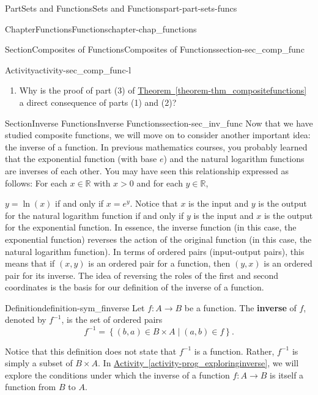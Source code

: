 \documentclass[oneside,10pt,]{book}
\newcommand{\xreffont}{\relax}
\newcommand{\terminology}[1]{\textbf{#1}}
\numberwithin{equation}{chapter}
\newcommand{\R}{\mathbb{R}}
\newcommand{\gt}{>}
\begin{document}
\begin{partptx}{Part}{Sets and Functions}{}{Sets and Functions}{}{}{part-part-sets-funcs}
\begin{chapterptx}{Chapter}{Functions}{}{Functions}{}{}{chapter-chap_functions}
\begin{sectionptx}{Section}{Composites of Functions}{}{Composites of Functions}{}{}{section-sec_comp_func}
\begin{activity}{Activity}{}{activity-sec_comp_func-l}
\begin{enumerate}[font=\bfseries,label=(\alph*),ref=\alph*]
\item{}Why is the proof of part (3) of \hyperref[theorem-thm_compositefunctions]{Theorem~{\xreffont\ref{theorem-thm_compositefunctions}}} a direct consequence of parts (1) and (2)?%
\end{enumerate}%
\end{activity}%
\end{sectionptx}
%
%
\typeout{************************************************}
\typeout{************************************************}
%
\begin{sectionptx}{Section}{Inverse Functions}{}{Inverse Functions}{}{}{section-sec_inv_func}
Now that we have studied composite functions, we will move on to consider another important idea: the inverse of a function. In previous mathematics courses, you probably learned that the exponential function (with base \(e\)) and the natural logarithm functions are inverses of each other. You may have seen this relationship expressed as follows: For each \(x \in \R\) with \(x \gt 0\) and for each \(y \in \R\),%
\par
\(y = \ln(x)\) if and only if \(x = e^y\). Notice that \(x\) is the input and \(y\) is the output for the natural logarithm function if and only if \(y\) is the input and \(x\) is the output for the exponential function. In essence, the inverse function (in this case, the exponential function) reverses the action of the original function (in this case, the natural logarithm function). In terms of ordered pairs (input-output pairs), this means that if \(( {x, y} )\) is an ordered pair for a function, then \(( {y, x} )\) is an ordered pair for its inverse. The idea of reversing the roles of the first and second coordinates is the basis for our definition of the inverse of a function.%
\begin{definition}{Definition}{}{definition-sym_finverse}%
%
Let \(f : A \to B\) be a function. The \terminology{inverse} of \(f\), denoted by \(f^{ - 1}\), is the set of ordered pairs%
\begin{equation*}
f^{ - 1}  = \left\{ { {( {b, a} ) \in B \times A} \mid ( {a, b} ) \in f} \right\}\text{.}
\end{equation*}
%
\end{definition}
Notice that this definition does not state that \(f^{-1}\) is a function. Rather, \(f^{-1}\) is simply a subset of \(B \times A\). In \hyperref[activity-prog_exploringinverse]{Activity~{\xreffont\ref{activity-prog_exploringinverse}}}, we will explore the conditions under which the inverse of a function \(f: A \to B\) is itself a function from \(B\) to \(A\).%

\end{sectionptx}
\end{chapterptx}
\end{partptx}
\end{document}
